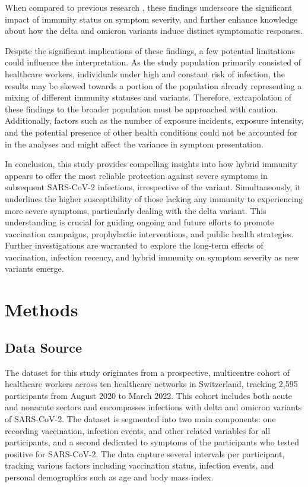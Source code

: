 \documentclass[11pt]{article}
\begin{document}
When compared to previous research \cite{Kim2020SARSCoV2SpecificAA, Chen2020DiseaseSD, Maier2021AnIC, Jesek2020ImmunePA, Whitaker2022VariantspecificSO}, these findings underscore the significant impact of immunity status on symptom severity, and further enhance knowledge about how the delta and omicron variants induce distinct symptomatic responses.

Despite the significant implications of these findings, a few potential limitations could influence the interpretation. As the study population primarily consisted of healthcare workers, individuals under high and constant risk of infection, the results may be skewed towards a portion of the population already representing a mixing of different immunity statuses and variants. Therefore, extrapolation of these findings to the broader population must be approached with caution. Additionally, factors such as the number of exposure incidents, exposure intensity, and the potential presence of other health conditions could not be accounted for in the analyses and might affect the variance in symptom presentation.

In conclusion, this study provides compelling insights into how hybrid immunity appears to offer the most reliable protection against severe symptoms in subsequent SARS-CoV-2 infections, irrespective of the variant. Simultaneously, it underlines the higher susceptibility of those lacking any immunity to experiencing more severe symptoms, particularly dealing with the delta variant. This understanding is crucial for guiding ongoing and future efforts to promote vaccination campaigns, prophylactic interventions, and public health strategies. Further investigations are warranted to explore the long-term effects of vaccination, infection recency, and hybrid immunity on symptom severity as new variants emerge.

\section*{Methods}

\subsection*{Data Source}
The dataset for this study originates from a prospective, multicentre cohort of healthcare workers across ten healthcare networks in Switzerland, tracking 2,595 participants from August 2020 to March 2022. This cohort includes both acute and nonacute sectors and encompasses infections with delta and omicron variants of SARS-CoV-2. The dataset is segmented into two main components: one recording vaccination, infection events, and other related variables for all participants, and a second dedicated to symptoms of the participants who tested positive for SARS-CoV-2. The data capture several intervals per participant, tracking various factors including vaccination status, infection events, and personal demographics such as age and body mass index.
\end{document}
